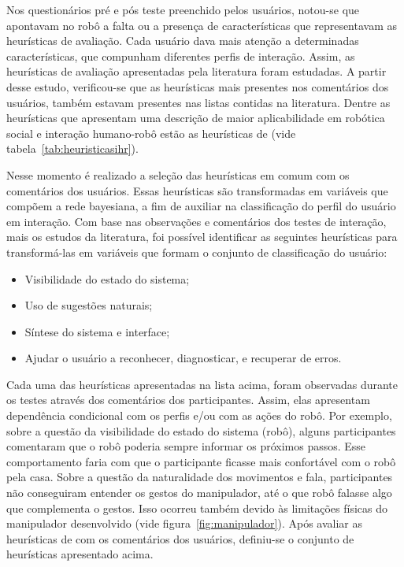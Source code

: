 Nos questionários pré e pós teste preenchido pelos usuários, notou-se que apontavam no robô a falta ou a presença de características que representavam as heurísticas de avaliação. Cada usuário dava mais atenção a determinadas características, que compunham diferentes perfis de interação. Assim, as heurísticas de avaliação apresentadas pela literatura foram estudadas. A partir desse estudo, verificou-se que as heurísticas mais presentes nos comentários dos usuários, também estavam presentes nas listas contidas na literatura. Dentre as heurísticas que apresentam uma descrição de maior aplicabilidade em robótica social e interação humano-robô estão as heurísticas de  (vide tabela~\ref{tab:heuristicasihr}).

Nesse momento é realizado a seleção das heurísticas em comum com os comentários dos usuários. Essas heurísticas são transformadas em variáveis que compõem a rede bayesiana, a fim de auxiliar na classificação do perfil do usuário em interação. Com base nas observações e comentários dos testes de interação, mais os estudos da literatura, foi possível identificar as seguintes heurísticas para transformá-las em variáveis que formam o conjunto de classificação do usuário:

\begin{itemize}
	\item Visibilidade do estado do sistema;
	\item Uso de sugestões naturais;
	\item Síntese do sistema e interface;
	\item Ajudar o usuário a reconhecer, diagnosticar, e recuperar de erros.
\end{itemize}

Cada uma das heurísticas apresentadas na lista acima, foram observadas durante os testes através dos comentários dos participantes. Assim, elas apresentam dependência condicional com os perfis e/ou com as ações do robô. Por exemplo, sobre a questão da visibilidade do estado do sistema (robô), alguns participantes comentaram que o robô poderia sempre informar os próximos passos. Esse comportamento faria com que o participante ficasse mais confortável com o robô pela casa. Sobre a questão da naturalidade dos movimentos e fala, participantes não conseguiram entender os gestos do manipulador, até o que robô falasse algo que complementa o gestos. Isso ocorreu também devido às limitações físicas do manipulador desenvolvido (vide figura~\ref{fig:manipulador}). Após avaliar as heurísticas de \textcite{clarkson:2007} com os comentários dos usuários, definiu-se o conjunto de heurísticas apresentado acima.


